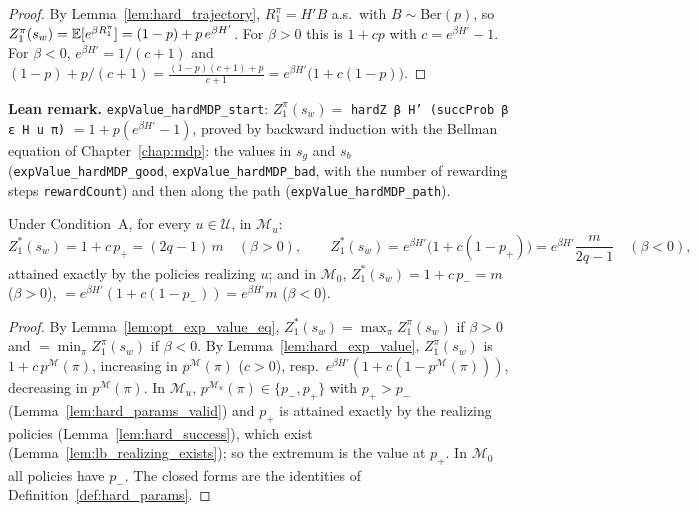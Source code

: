 \begin{proof}
\leanok
{}
By Lemma~\ref{lem:hard_trajectory}, $R^\pi_1 = H' B$ a.s.\ with $B \sim \mathrm{Ber}(p)$, so
$Z^\pi_1(s_w) = \mathbb{E}[e^{\beta R^\pi_1}] = (1 - p) + p\,e^{\beta H'}$. For $\beta > 0$ this is
$1 + c p$ with $c = e^{\beta H'} - 1$. For $\beta < 0$, $e^{\beta H'} = 1/(c+1)$ and
$(1-p) + p/(c+1) = \frac{(1-p)(c+1) + p}{c+1} = e^{\beta H'}\big(1 + c(1-p)\big)$.
\end{proof}

\textbf{Lean remark.} \texttt{expValue\_hardMDP\_start}: $Z^\pi_1(s_w) = $ \texttt{hardZ β H' (succProb β ε H u π)}
$= 1 + p(e^{\beta H'} - 1)$, proved by backward induction with the Bellman equation of Chapter~\ref{chap:mdp}:
the values in $s_g$ and $s_b$ (\texttt{expValue\_hardMDP\_good}, \texttt{expValue\_hardMDP\_bad}, with the
number of rewarding steps \texttt{rewardCount}) and then along the path (\texttt{expValue\_hardMDP\_path}).

\begin{lemma}\label{lem:hard_opt_value}
Under Condition~A, for every $u \in \mathcal U$, in $\mathcal M_u$:
\[
  Z^*_1(s_w) = 1 + c\,p_+ = (2q-1)\,m \quad (\beta > 0), \qquad
  Z^*_1(s_w) = e^{\beta H'}\big(1 + c(1 - p_+)\big) = e^{\beta H'}\frac{m}{2q-1} \quad (\beta < 0),
\]
attained exactly by the policies realizing $u$; and in $\mathcal M_0$, $Z^*_1(s_w) = 1 + c\,p_- = m$
($\beta > 0$), $= e^{\beta H'}(1 + c(1-p_-)) = e^{\beta H'} m$ ($\beta < 0$).
\end{lemma}

\begin{proof}
By Lemma~\ref{lem:opt_exp_value_eq}, $Z^*_1(s_w) = \max_\pi Z^\pi_1(s_w)$ if $\beta > 0$ and
$= \min_\pi Z^\pi_1(s_w)$ if $\beta < 0$. By Lemma~\ref{lem:hard_exp_value}, $Z^\pi_1(s_w)$ is
$1 + c\,p^{\mathcal M}(\pi)$, increasing in $p^{\mathcal M}(\pi)$ ($c > 0$), resp.\
$e^{\beta H'}(1 + c(1 - p^{\mathcal M}(\pi)))$, decreasing in $p^{\mathcal M}(\pi)$. In
$\mathcal M_u$, $p^{\mathcal M_u}(\pi) \in \{p_-, p_+\}$ with $p_+ > p_-$
(Lemma~\ref{lem:hard_params_valid}) and $p_+$ is attained exactly by the realizing policies
(Lemma~\ref{lem:hard_success}), which exist (Lemma~\ref{lem:lb_realizing_exists}); so the
extremum is the value at $p_+$. In $\mathcal M_0$ all policies have $p_-$. The closed forms
are the identities of Definition~\ref{def:hard_params}.
\end{proof}

